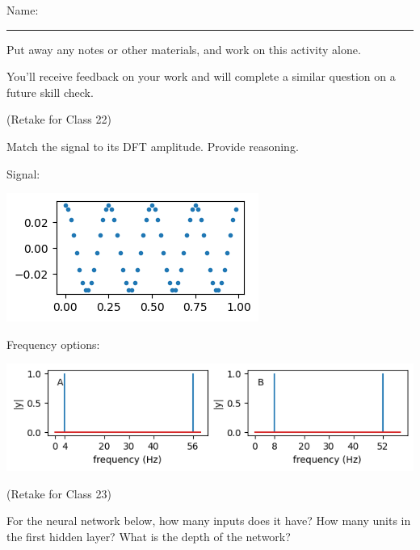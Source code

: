 \documentclass[12pt,letterpaper,noanswers]{exam}
\begin{document}
 \pdfpageheight 11in 
  \pdfpagewidth 8.5in

\noindent Name: \rule{2.5in}{0.5pt}

\noindent Put away any notes or other materials, and work on this activity alone.

\noindent You'll receive feedback on your work and will complete a similar question on a future skill check.


\begin{questions}

\item (Retake for Class 22)

Match the signal to its DFT amplitude.  Provide reasoning.

Signal:

\includegraphics[width=0.3\linewidth]{img/C21skill-2.png}

Frequency options:

\includegraphics[width=0.7\linewidth]{img/C21skill2-2.png}
\vspace{3cm}
\item (Retake for Class 23)

For the neural network below, how many inputs does it have?  How many units in the first hidden layer?  What is the depth of the network?


\end{questions}
\end{document}
